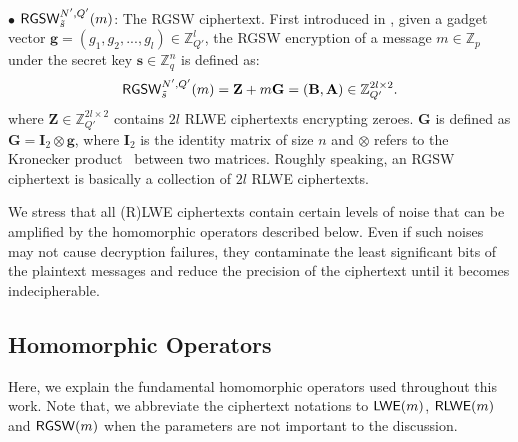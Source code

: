 $\bullet$ ${\mathsf{RGSW}}_{\Tilde{s}}^{N',Q'}(m)$: The RGSW ciphertext. First introduced in \cite{DBLP:conf/crypto/GentrySW13}, given a gadget vector $\mathbf{g} 
= (g_{1}, g_{2}, ..., g_{l}) \in \mathbb{Z}_{Q'}^{l}$, 
the RGSW encryption of a message $m 
\in \mathbb{Z}_p$ under the secret key $\mathbf{s} \in 
\mathbb{Z}_{q}^{n}$ is defined as: 
\[
    {\mathsf{RGSW}}_{\Tilde{s}}^{N',Q'}(m) 
    = \mathbf{Z} + m\mathbf{G} = (\mathbf{B}, \mathbf{A}) 
    \in \mathbb{Z}_{Q'}^{2l \times 2}.
\]
where $\mathbf{Z} \in \mathbb{Z}_{Q'}^{2l \times 2}$ contains $2l$ RLWE ciphertexts encrypting zeroes. 
$\mathbf{G}$ is defined as $\mathbf{G} = \mathbf{I}_{2} \otimes \mathbf{g}$,
where $\mathbf{I}_{2}$ is the identity matrix of size $n$ and 
$\otimes$ refers to the Kronecker product~\cite{kronecker} between two matrices.
Roughly speaking, an RGSW ciphertext is basically a collection of $2l$ RLWE ciphertexts.

We stress that all (R)LWE ciphertexts
contain certain levels of noise that can be amplified by the homomorphic
operators described below. Even if such noises may not cause decryption failures,
they contaminate the least significant bits of the plaintext messages and reduce 
the precision of the ciphertext until it becomes indecipherable.



\subsection{Homomorphic Operators} \label{pre:he_circuits}
Here, we explain the fundamental homomorphic operators used throughout this
work.
Note that, we abbreviate the ciphertext notations to ${\mathsf{LWE}}(m)$, ${\mathsf{RLWE}}(m)$ 
and ${\mathsf{RGSW}}(m)$ when the parameters are not important to the discussion.

